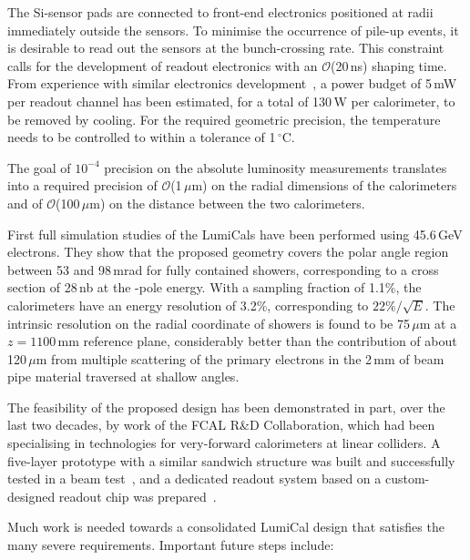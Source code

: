 The Si-sensor pads are connected to front-end electronics positioned at radii immediately outside the sensors. 
To minimise the occurrence of pile-up events, it is desirable to read out the sensors at the bunch-crossing rate. 
This constraint calls for the development of readout electronics with an $\mathcal{O}$(20\,ns) shaping time. 
From experience with similar electronics development~\cite{FCAL:FLAME}, 
a power budget of 5\,mW per readout channel has been estimated, for a total of 130\,W per calorimeter, to be removed by cooling. 
For the required geometric precision, the temperature needs to be controlled to within a tolerance of 1\,$^\circ$C.

The goal of $10^{-4}$ precision on the absolute luminosity measurements translates into a required precision of 
$\mathcal{O}$(1\,$\mu$m) on the radial dimensions of the calorimeters 
and of $\mathcal{O}$(100\,$\mu$m) on the distance between the two calorimeters.

First full simulation studies of the LumiCals have been performed using 45.6\,GeV electrons. 
They show that the proposed geometry covers the polar angle region between 53 and 98\,mrad for fully contained showers, 
corresponding to a cross section of 28\,nb at the \PZ-pole energy. 
With a sampling fraction of 1.1\%, the calorimeters have an energy resolution of 3.2\%, corresponding to $22\%/\sqrt{E}$. 
The intrinsic resolution on the radial coordinate of showers is found to be 75\,$\mu$m at a $z = 1100$\,mm reference plane, 
considerably better than the contribution of about 120\,$\mu$m 
from multiple scattering of the primary electrons in the 2\,mm of beam pipe material traversed at shallow angles.

The feasibility of the proposed design has been demonstrated in part, over the last two decades, 
by work of the FCAL R\&D Collaboration, which had been specialising in technologies for very-forward calorimeters at linear colliders. 
A five-layer prototype with a similar sandwich structure was built and successfully tested in a beam test~\cite{Abramowicz:2018vwb}, 
and a dedicated readout system based on a custom-designed readout chip was prepared~\cite{FCAL:FLAME,FCAL:FLAME2}. 

Much work is needed towards a consolidated LumiCal design that satisfies the many severe requirements. 
Important future steps include:

